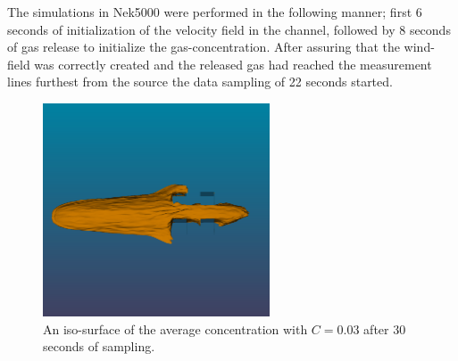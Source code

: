 The simulations in Nek5000 were performed in the following manner; first 6 seconds of initialization of the velocity field in the 
channel, followed by 8 seconds of gas release to initialize the gas-concentration. After assuring that the wind-field was 
correctly created and the released gas had reached the measurement lines furthest from the source the data sampling of 22 seconds 
started.
%
\begin{figure}[h]
	\centering
	\includegraphics[width=0.6\textwidth]{Figures/plume2.png}
	\caption{An iso-surface of the average concentration with $C=0.03$ 
    after 30 seconds of sampling.}
	\label{fig:plume}
\end{figure}
%

